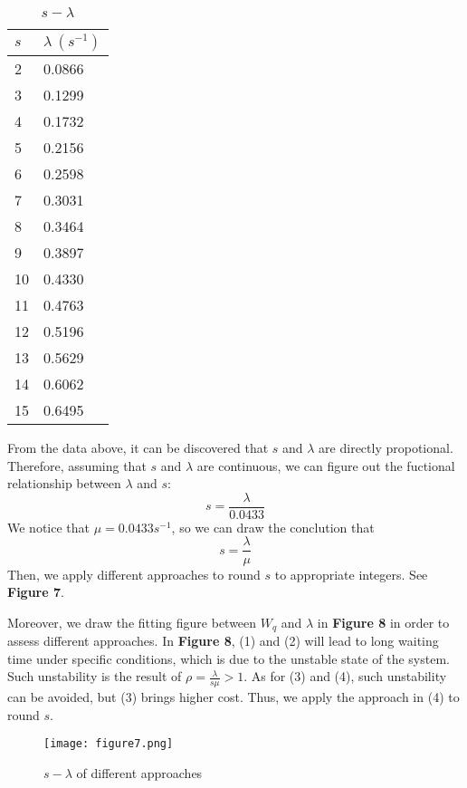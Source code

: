 \documentclass{mcmthesis}
\begin{document}
\begin{table}[htbp]
\centering
\begin{tabular}{m{4cm}<{\centering}m{4cm}<{\centering}}
\toprule
\textbf{$s$}&\textbf{$\lambda\ (s^{-1})$}\\
\midrule
2&0.0866\\

3&0.1299\\

4&0.1732\\

5&0.2156\\

6&0.2598\\

7&0.3031\\

8&0.3464\\

9&0.3897\\

10&0.4330\\ 

11&0.4763\\ 

12&0.5196\\

13&0.5629\\

14&0.6062\\
 
15&0.6495\\
\bottomrule
\end{tabular}
\caption{$s-\lambda$}\label{tab:Data}
\end{table}
From the data above, it can be discovered that $s$ and $\lambda$ are directly propotional. Therefore, assuming that $s$ and $\lambda$ are continuous, we can figure out the fuctional relationship between $\lambda$ and $s$:
$$s=\frac{\lambda}{0.0433}$$
We notice that $\mu=0.0433s^{-1}$, so we can draw the conclution that
$$s=\frac{\lambda}{\mu}$$
Then, we apply different approaches to round $s$ to appropriate integers. See \textbf{Figure 7}.


Moreover, we draw the fitting figure between $W_q$ and $\lambda$ in \textbf{Figure 8} in order to assess different  approaches. In \textbf{Figure 8}, (1) and (2) will lead to long waiting time under specific conditions, which is due to the unstable state of the system. Such unstability is the result of $\rho=\frac{\lambda}{s\mu}>1$. As for (3) and (4), such unstability can be avoided, but (3) brings higher cost. Thus, we apply the approach in (4) to round $s$. 
\begin{figure}[H]
\small
\centering
\texttt{[image: figure7.png]}
\caption{$s-\lambda$ of different approaches} \label{fig:7}
\end{figure} 
\end{document}
